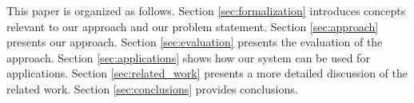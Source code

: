 \documentclass{IEEEtran}
\theoremstyle{definition}
\begin{document}
This paper is organized as follows.
Section \ref{sec:formalization} introduces concepts relevant to our approach and our problem statement. Section \ref{sec:approach} presents our approach. Section \ref{sec:evaluation} presents the evaluation of the approach. Section \ref{sec:applications} shows how our system can be used for applications. Section \ref{sec:related_work} presents a more detailed discussion of the related work. Section \ref{sec:conclusions} provides conclusions.



\end{document}
